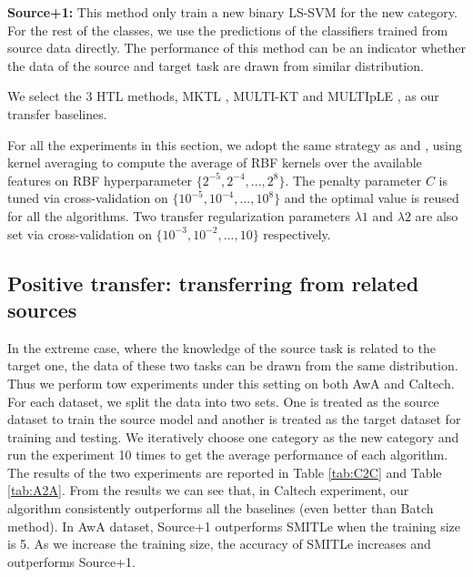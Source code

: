 \textbf{Source+1:} This method only train a new binary LS-SVM for the new category. For the rest of the classes, we use the predictions of the classifiers trained from source data directly. %
The performance of this method can be an indicator whether the data of the source and target task are drawn from similar distribution.

We select the 3 HTL methods, {MKTL \cite{jie2011multiclass}}, {MULTI-KT \cite{tommasi2014learning}} and MULTIpLE \cite{kuzborskij2013n}, as our transfer baselines.





For all the experiments in this section, we adopt the same strategy as \cite{kuzborskij2013n} and \cite{tommasi2014learning}, using kernel averaging \cite{gehler2009feature} to compute the average of RBF kernels over the available features on RBF hyperparameter $\{2^{-5},2^{-4},...,2^8\}$. The penalty parameter $C$ is tuned via cross-validation on $\{10^{-5},10^{-4},...,10^8\}$ and the optimal value is reused for all the algorithms.
Two transfer regularization parameters $\lambda1$ and $\lambda2$ are also set via cross-validation on $\{10^{-3},10^{-2},...,10\}$ respectively.

\subsection{Positive transfer: transferring from related sources}
In the extreme case, where the knowledge of the source task is related to the target one, the data of these two tasks can be drawn from the same distribution. Thus we perform tow experiments under this setting on both AwA and Caltech. For each dataset, we split the data into two sets. One is treated as the source dataset to train the source model and another is treated as the target dataset for training and testing. We iteratively choose one category as the new category and run the experiment 10 times to get the average performance of each algorithm. The results of the two experiments are reported in Table \ref{tab:C2C} and Table \ref{tab:A2A}. From the results we can see that, in Caltech experiment, our algorithm consistently outperforms all the baselines (even better than Batch method). In AwA dataset, Source+1 outperforms SMITLe when the training size is 5. As we increase the training size, the accuracy of SMITLe increases and outperforms Source+1.

